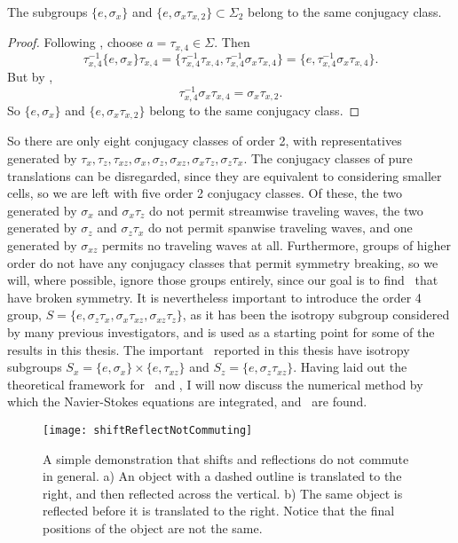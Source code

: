 \clearpage
\begin{theorem}
The subgroups $\{ e, \sigma_x\}$ and $\{e, \sigma_x\tau_{x,2}\} \subset \Sigma_2$ belong to the same conjugacy class.
\end{theorem}
\begin{proof}
Following , choose $a = \tau_{x,4} \in \Sigma$. Then
\begin{equation}
\tau_{x,4}^{-1}\{ e, \sigma_x\}\tau_{x,4} = \{ \tau_{x,4}^{-1}\tau_{x,4},\tau_{x,4}^{-1}\sigma_x\tau_{x,4}\} =\{e,\tau_{x,4}^{-1}\sigma_x\tau_{x,4}\} .
\end{equation}
But by ,
\begin{equation}
\tau_{x,4}^{-1}\sigma_x\tau_{x,4} = \sigma_x\tau_{x,2}.
\end{equation}
So $\{ e, \sigma_x\}$ and $\{e, \sigma_x\tau_{x,2}\}$ belong to the same conjugacy class.
\end{proof}

So there are only eight conjugacy classes of order 2, with representatives generated by $\tau_x,\tau_z,\tau_{xz}, \sigma_x,\sigma_z,\sigma_{xz},\sigma_{x}\tau_z,\sigma_z\tau_x$. The conjugacy classes of pure translations can be disregarded, since they are equivalent to considering smaller cells, so we are left with five order 2 conjugacy classes. Of these, the two  generated by $\sigma_x$ and $\sigma_x\tau_z$ do not permit streamwise traveling waves, the two generated by $\sigma_z$ and $\sigma_z\tau_x$ do not permit spanwise traveling waves, and one generated by  $\sigma_{xz}$ permits no traveling waves at all. Furthermore, groups of higher order do not have any conjugacy classes that permit symmetry breaking, so we will, where possible, ignore those groups entirely, since our goal is to find \ecs\ that have broken symmetry. It is nevertheless important to introduce the order 4 group, $S = \{ e, \sigma_z\tau_x,\sigma_x\tau_{xz},\sigma_{xz}\tau_z\}$, as it has been the isotropy subgroup considered by many previous investigators, and is used as a starting point for some of the results in this thesis. The important \ecs\ reported in this thesis have isotropy subgroups $S_x = \{ e, \sigma_x\} \times \{e,\tau_{xz}\}$ and $S_z = \{e, \sigma_z\tau_{xz}\}$. Having laid out the theoretical framework for \pCf\ and \ecs, I will now discuss the numerical method by which the Navier-Stokes equations are integrated, and \ecs\ are found.  
\begin{figure}[t!]
\texttt{[image: shiftReflectNotCommuting]}
\caption[A simple demonstration that shifts and reflections do not commute in general.]{A simple demonstration that shifts and reflections do not commute in general. a) An object with a dashed outline is translated to the right, and then reflected across the vertical. b) The same object is reflected before it is translated to the right. Notice that the final positions of the object are not the same.}\label{fig:notabelian}
\end{figure}

